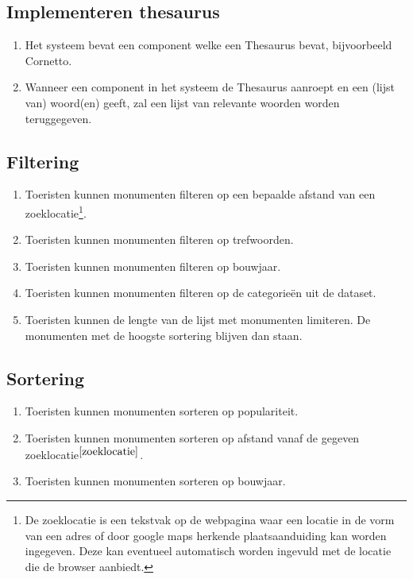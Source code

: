 \documentclass[a4paper,10pt]{article}
\newcommand{\rsubsection}[1]{
\subsection{#1}\label{sec:sub:#1}
}
\begin{document}
\rsubsection{Implementeren thesaurus}
\begin{enumerate}
\item Het systeem bevat een component welke een Thesaurus bevat, bijvoorbeeld Cornetto.
\item Wanneer een component in het systeem de Thesaurus aanroept en een (lijst van) woord(en) geeft, zal een lijst van relevante woorden worden teruggegeven.
\end{enumerate}

	\rsubsection{Filtering}
	\label{filtering}
	\begin{enumerate}
		\item Toeristen kunnen monumenten filteren op een bepaalde afstand van een zoeklocatie\footnote{\label{zoeklocatie}De zoeklocatie is een tekstvak op de webpagina waar een locatie in de vorm van een adres of door google maps herkende plaatsaanduiding kan worden ingegeven. Deze kan eventueel automatisch worden ingevuld met de locatie die de browser aanbiedt.}.
		\item Toeristen kunnen monumenten filteren op trefwoorden.	
\item Toeristen kunnen monumenten filteren op bouwjaar.
\item Toeristen kunnen monumenten filteren op de categorie\"en uit de dataset.
		\item Toeristen kunnen de lengte van de lijst met monumenten limiteren. De monumenten met de hoogste sortering blijven dan staan.
	\end{enumerate}
		
\rsubsection{Sortering}
\label{sortering}
\begin{enumerate}
\item Toeristen kunnen monumenten sorteren op populariteit.
	\item Toeristen kunnen monumenten sorteren op afstand vanaf de gegeven zoeklocatie$^{\ref{zoeklocatie}}$.
\item Toeristen kunnen monumenten sorteren op bouwjaar.
\end{enumerate}
		
\end{document}
